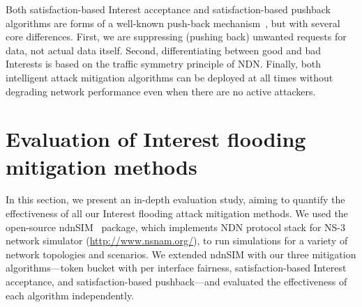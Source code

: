 \documentclass[10pt,conference]{IEEEtran}
\begin{document}
{Both satisfaction-based Interest acceptance and satisfaction-based pushback algorithms are forms of a well-known push-back mechanism~\cite{Pushback}, but with several core differences. 
First, we are suppressing (pushing back) unwanted requests for data, not actual data itself.
Second, differentiating between good and bad Interests is based on the traffic symmetry principle of NDN.
Finally, both intelligent attack mitigation algorithms can be deployed at all times without degrading network performance even when there are no active attackers. 


\section{Evaluation of Interest flooding mitigation methods}
\label{sec:evaluation}




In this section, we present an in-depth evaluation study, aiming to quantify the effectiveness of all our Interest flooding attack mitigation methods.
We used the open-source ndnSIM~\cite{ndnsim} package, which implements NDN protocol stack for NS-3 network simulator (\url{http://www.nsnam.org/}), to run simulations for a variety of network topologies and scenarios. 
We extended ndnSIM with our three mitigation algorithms---token bucket with per interface fairness, satisfaction-based Interest acceptance, and satisfaction-based pushback---and evaluated the effectiveness of each algorithm independently.




}
\end{document}
